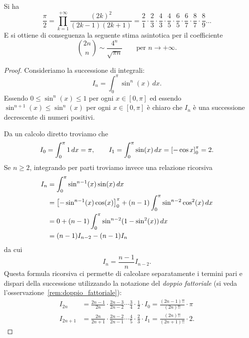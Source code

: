 \begin{theorem}
\label{th:wallis}%
\mymark{*}%
%
%
%
%
Si ha
\[
  \frac{\pi}{2}
  = \prod_{k=1}^{+\infty} \frac{(2k)^2}{(2k-1)(2k+1)}
  = \frac{2}{1}
  \cdot \frac{2}{3}
  \cdot \frac{4}{3}
  \cdot \frac{4}{5}
  \cdot \frac{6}{5}
  \cdot \frac{6}{7}
  \cdot \frac{8}{7}
  \cdot \frac{8}{9}
  \dots
\]
E si ottiene di conseguenza la seguente stima asintotica per
il coefficiente 
\[
 {2n \choose n} \sim \frac{4^n}{\sqrt{\pi n}}
 \qquad \text{per $n\to +\infty$.}
\]
\end{theorem}
%
\begin{proof}
Consideriamo la successione di integrali:
\[
  I_n = \int_0^\pi \sin^n(x)\, dx.
\]
Essendo $0\le \sin^n(x) \le 1$ per ogni $x\in [0,\pi]$ ed essendo
$\sin^{n+1}(x)\le \sin^n(x)$ per ogni $x\in[0,\pi]$ è chiaro che $I_n$ è una
successione decrescente di numeri positivi.

Da un calcolo diretto troviamo che
\[
  I_0 = \int_0^\pi 1\, dx = \pi, \qquad
  I_1 = \int_0^\pi \sin(x)\, dx = {\left[ -\cos x \right]}_0^\pi = 2.
\]
Se $n\ge 2$,
integrando per parti troviamo invece una relazione ricorsiva
\begin{align*}
 I_n &= \int_0^\pi \sin^{n-1}(x) \sin(x)\, dx \\
     &= {\left[ -\sin^{n-1}(x)\cos(x) \right]}_0^\pi + (n-1)\int_0^\pi \sin^{n-2} \cos^2(x)\, dx \\
     &= 0 + (n-1)\int_0^\pi\sin^{n-2}(1-\sin^2(x))\, dx \\
     &= (n-1) I_{n-2} - (n-1) I_{n}
\end{align*}
da cui
\begin{equation}
\label{eq:187464}%
  I_n = \frac{n-1}{n} I_{n-2}.
\end{equation}
Questa formula ricorsiva ci permette di calcolare separatamente
i termini pari e dispari della successione
utilizzando la notazione del \emph{doppio fattoriale}
(si veda l'osservazione~\ref{rem:doppio_fattoriale}):
\begin{align*}
  I_{2n}
  &= \frac{2n-1}{2n}\cdot \frac{2n-3}{2n-2} \cdots \frac {3}{4}\cdot \frac{1}{2} \cdot I_0
  = \frac{(2n-1)!!}{(2n)!!} \cdot \pi \\
  I_{2n+1} &= \frac{2n}{2n+1}\cdot \frac {2n-2}{2n-1} \cdots
  \frac{4}{5}\cdot \frac{2}{3} \cdot I_1
  = \frac{(2n)!!}{(2n+1)!!}\cdot 2.
\end{align*}


\end{proof}
